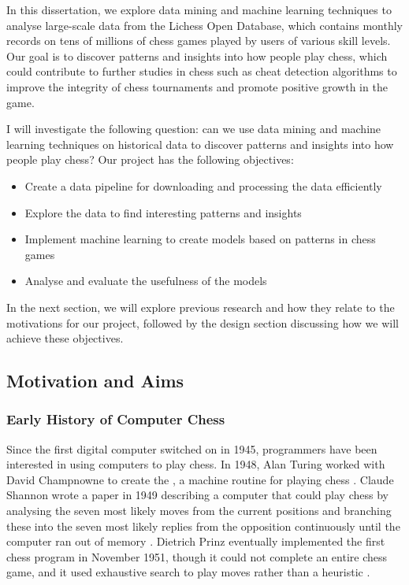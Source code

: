 \documentclass[a4paper, 11pt]{article}
\begin{document}
In this dissertation, we explore data mining and machine learning techniques to analyse large-scale data from the Lichess Open Database, which contains monthly records on tens of millions of chess games played by users of various skill levels. Our goal is to discover patterns and insights into how people play chess, which could contribute to further studies in chess such as cheat detection algorithms to improve the integrity of chess tournaments and promote positive growth in the game.

I will investigate the following question: can we use data mining and machine learning techniques on historical data to discover patterns and insights into how people play chess? Our project has the following objectives:

\begin{itemize}
    \setlength\itemsep{0em}
    \item Create a data pipeline for downloading and processing the data efficiently
    \item Explore the data to find interesting patterns and insights
    \item Implement machine learning to create models based on patterns in chess games
    \item Analyse and evaluate the usefulness of the models
\end{itemize}

In the next section, we will explore previous research and how they relate to the motivations for our project, followed by the design section discussing how we will achieve these objectives.

\subsection{Motivation and Aims}

\subsubsection{Early History of Computer Chess}
Since the first digital computer switched on in 1945, programmers have been interested in using computers to play chess. In 1948, Alan Turing worked with David Champnowne to create the , a machine routine for playing chess \cite{copeland2005turing}. Claude Shannon wrote a paper in 1949 describing a computer that could play chess by analysing the seven most likely moves from the current positions and branching these into the seven most likely replies from the opposition continuously until the computer ran out of memory \cite{shannon1950xxii}. Dietrich Prinz eventually implemented the first chess program in November 1951, though it could not complete an entire chess game, and it used exhaustive search to play moves rather than a heuristic \cite{copeland2005turing}.
\end{document}
